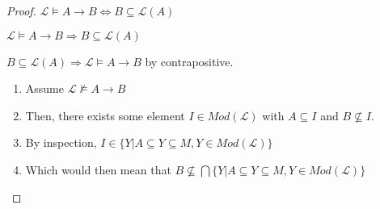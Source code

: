 \begin{proof}
    $\mathcal{L} \models A\rightarrow B \iff B \subseteq \mathcal{L}(A)$

    $\mathcal{L} \models A\rightarrow B \Rightarrow B \subseteq \mathcal{L}(A)$

    $B \subseteq \mathcal{L}(A) \Rightarrow \mathcal{L} \models A\rightarrow B$ by contrapositive.
    \begin{enumerate}
        \item Assume $\mathcal{L} \not \models A \rightarrow B$ 
        \item Then, there exists some element $I \in Mod(\mathcal{L})$ with $A\subseteq I$ and $B \not \subseteq I$. 
        \item By inspection, $I \in \{Y | A \subseteq Y \subseteq M, Y \in Mod(\mathcal{L})\}$
        \item Which would then mean that $B \not \subseteq \bigcap \{Y | A \subseteq Y \subseteq M, Y \in Mod(\mathcal{L})\}$ 
    \end{enumerate}
\end{proof}